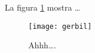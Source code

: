 \documentclass{article}
\begin{document}
La figura \ref{fig:gerbil} mostra \ldots

\begin{figure}
\centering
\texttt{[image: gerbil]}
\caption{\label{fig:gerbil}Ahhh\ldots.}
\end{figure}
\end{document}
